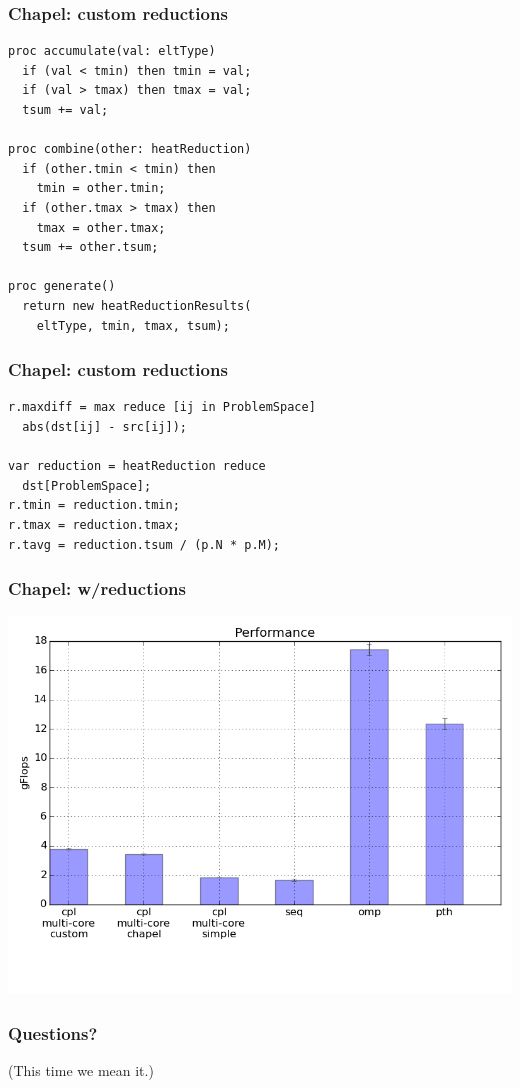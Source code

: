 \documentclass{beamer}
\begin{document}
\begin{frame}[fragile]
 \frametitle{Chapel: custom reductions}
\begin{verbatim}
proc accumulate(val: eltType)
  if (val < tmin) then tmin = val;
  if (val > tmax) then tmax = val;
  tsum += val;

proc combine(other: heatReduction)
  if (other.tmin < tmin) then
    tmin = other.tmin;
  if (other.tmax > tmax) then
    tmax = other.tmax;
  tsum += other.tsum;

proc generate()
  return new heatReductionResults(
    eltType, tmin, tmax, tsum);
\end{verbatim}
\end{frame}

\begin{frame}[fragile]
 \frametitle{Chapel: custom reductions}
\begin{verbatim}
r.maxdiff = max reduce [ij in ProblemSpace]
  abs(dst[ij] - src[ij]);

var reduction = heatReduction reduce
  dst[ProblemSpace];
r.tmin = reduction.tmin;
r.tmax = reduction.tmax;
r.tavg = reduction.tsum / (p.N * p.M);
\end{verbatim}
\end{frame}

\begin{frame}
 \frametitle{Chapel: w/reductions}
 \includegraphics[width=\textwidth]{../cpl/report/per_with_reductions.png}
\end{frame}

\begin{frame}
 \frametitle{Questions?}
 (This time we mean it.)
\end{frame}
\end{document}
